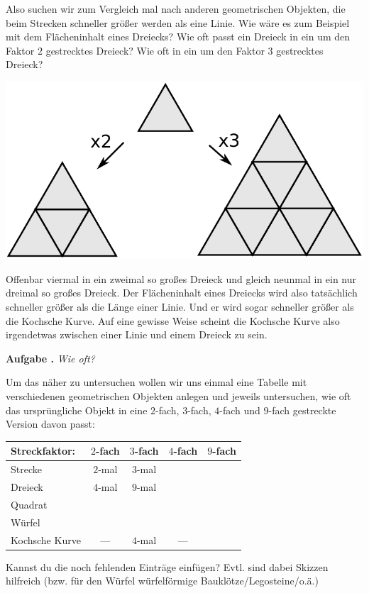 \documentclass[a4paper,ngerman,12pt]{scrartcl}
\theoremstyle{definition}
\theoremstyle{plain}
\theoremstyle{remark}
\newlength{\aufgabenskip}
\newcounter{aufgabennummer}
\newenvironment{aufgabe}[1]{
  \addtocounter{aufgabennummer}{1}
  \textbf{Aufgabe \theaufgabennummer.} \emph{#1} \par
}{\vspace{\aufgabenskip}}
\begin{document}
Also suchen wir zum Vergleich mal nach anderen geometrischen Objekten, die beim Strecken schneller größer werden als eine Linie. Wie wäre es zum Beispiel mit dem Flächeninhalt eines Dreiecks? Wie oft passt ein Dreieck in ein um den Faktor $2$ gestrecktes Dreieck? Wie oft in ein um den Faktor $3$ gestrecktes Dreieck?
\begin{center}
	\includegraphics[width=.4\textwidth]{Bilder/Dreieck_vergroessern.pdf}
\end{center}
Offenbar viermal in ein zweimal so großes Dreieck und gleich neunmal in ein nur dreimal so großes Dreieck. Der Flächeninhalt eines Dreiecks wird also tatsächlich schneller größer als die Länge einer Linie. Und er wird sogar schneller größer als die Kochsche Kurve. Auf eine gewisse Weise scheint die Kochsche Kurve also irgendetwas zwischen einer Linie und einem Dreieck zu sein.

\begin{aufgabe}{Wie oft?}\label{aufgabe:Wie_oft}
Um das näher zu untersuchen wollen wir uns einmal eine Tabelle mit verschiedenen geometrischen Objekten anlegen und jeweils untersuchen, wie oft das ursprüngliche Objekt in eine $2$-fach, $3$-fach, $4$-fach und $9$-fach gestreckte Version davon passt:
\begin{center}
	\renewcommand{\arraystretch}{2}
	\begin{tabular}{l||c|c|c|c}
		Streckfaktor:& $2$-fach & $3$-fach & $4$-fach & $9$-fach \\\hline\hline
		Strecke      & $2$-mal	& $3$-mal  &          &			 \\\hline
		Dreieck      & $4$-mal  & $9$-mal  &          &          \\\hline
		Quadrat      &          &          &          &          \\\hline
		Würfel       &          &          &          &          \\\hline
		Kochsche Kurve & ---   & $4$-mal  & ---      &          \\      	
	\end{tabular}
\end{center}
Kannst du die noch fehlenden Einträge einfügen? Evtl. sind dabei Skizzen hilfreich (bzw. für den Würfel würfelförmige Bauklötze/Legosteine/o.ä.)
\end{aufgabe}
\end{document}
